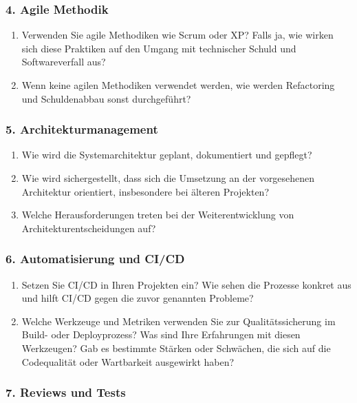 \subsubsection*{4. Agile Methodik}

\begin{enumerate}[resume]
  \item Verwenden Sie agile Methodiken wie Scrum oder XP? Falls ja, wie wirken sich diese Praktiken auf den Umgang mit technischer Schuld und Softwareverfall aus?
  \item Wenn keine agilen Methodiken verwendet werden, wie werden Refactoring und Schuldenabbau sonst durchgeführt?
\end{enumerate}

\subsubsection*{5. Architekturmanagement}

\begin{enumerate}[resume]
  \item Wie wird die Systemarchitektur geplant, dokumentiert und gepflegt?
  \item Wie wird sichergestellt, dass sich die Umsetzung an der vorgesehenen Architektur orientiert, insbesondere bei älteren Projekten?
  \item Welche Herausforderungen treten bei der Weiterentwicklung von Architekturentscheidungen auf?
\end{enumerate}

\subsubsection*{6. Automatisierung und CI/CD}

\begin{enumerate}[resume]
  \item Setzen Sie CI/CD in Ihren Projekten ein? Wie sehen die Prozesse konkret aus und hilft CI/CD gegen die zuvor genannten Probleme?
  \item Welche Werkzeuge und Metriken verwenden Sie zur Qualitätssicherung im Build- oder Deployprozess? Was sind Ihre Erfahrungen mit diesen Werkzeugen? Gab es bestimmte Stärken oder Schwächen, die sich auf die Codequalität oder Wartbarkeit ausgewirkt haben?
\end{enumerate}

\subsubsection*{7. Reviews und Tests}

